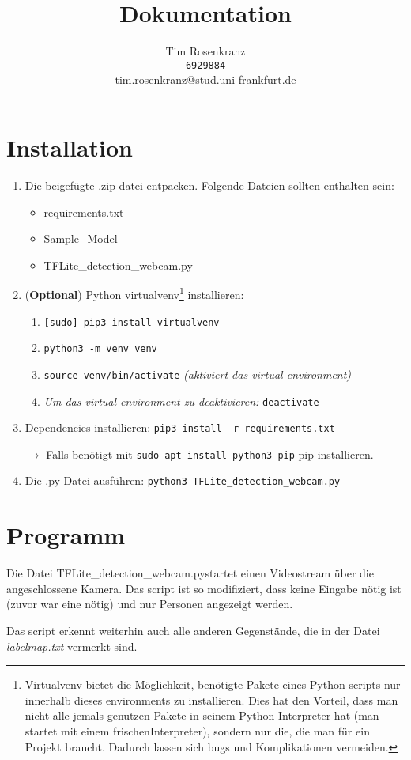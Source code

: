 \documentclass{article}
\title{Dokumentation}
\author{
Tim Rosenkranz \\ \texttt{6929884} \\ \href{mailto:tim.rosenkranz@stud.uni-frankfurt.de}{tim.rosenkranz@stud.uni-frankfurt.de}
}
\begin{document}
\maketitle
\tableofcontents

\section{Installation}
\begin{enumerate}
\item Die beigefügte .zip datei entpacken. Folgende Dateien sollten enthalten sein:
\begin{itemize}
\item requirements.txt
\item Sample\_Model
\item TFLite\_detection\_webcam.py
\end{itemize}
\item (\textbf{Optional}) Python virtualvenv\footnote{Virtualvenv bietet die Möglichkeit, benötigte Pakete eines Python scripts nur innerhalb dieses environments zu installieren. Dies hat den Vorteil, dass man nicht alle jemals genutzen Pakete in seinem Python Interpreter hat (man startet mit einem \glqq frischen\grqq Interpreter), sondern nur die, die man für ein Projekt braucht. Dadurch lassen sich bugs und Komplikationen vermeiden.} installieren:
\begin{enumerate}
\item[2.1.] \texttt{[sudo] pip3 install virtualvenv}
\item[2.2.] \texttt{python3 -m venv venv}
\item[2.3.] \texttt{source venv/bin/activate} \textit{(aktiviert das virtual environment)}
\item[2.4.] \textit{Um das virtual environment zu deaktivieren:} \texttt{deactivate}
\end{enumerate}
\item Dependencies installieren: \texttt{pip3 install -r requirements.txt}

$\rightarrow$ Falls benötigt mit \texttt{sudo apt install python3-pip} pip installieren.

\item Die .py Datei ausführen: \texttt{python3 TFLite\_detection\_webcam.py}
\end{enumerate}

\section{Programm}
\begin{flushleft}
Die Datei \glqq TFLite\_detection\_webcam.py\grqq startet einen Videostream über die angeschlossene Kamera. Das script ist so modifiziert, dass keine Eingabe nötig ist (zuvor war eine nötig) und nur Personen angezeigt werden.

Das script erkennt weiterhin auch alle anderen Gegenstände, die in der Datei \textit{labelmap.txt} vermerkt sind.
\end{flushleft}
\end{document}
